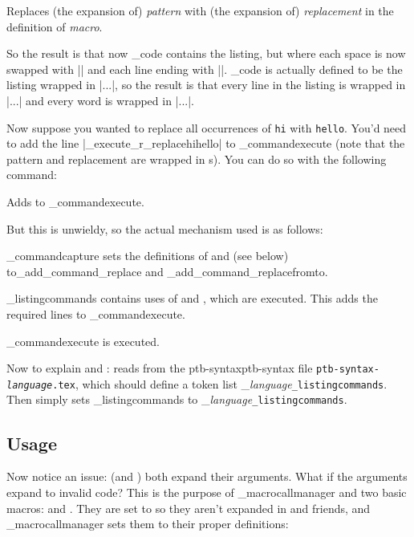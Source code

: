 Replaces (the expansion of) {\it pattern} with (the expansion of) {\it replacement} in the definition of {\it macro}.
\emacroexp

So the result is that now \macro\_code{} contains the listing, but where each space is now swapped with \inlinecode|\w \w| and each line ending with \inlinecode|\w\n\n\w|.
\macro\_code{} is actually defined to be the listing wrapped in \inlinecode|\n\w...\w\n|, so the result is that every line in the listing is wrapped in \inlinecode|\n...\n| and every word is wrapped in \inlinecode|\w...\w|.

Now suppose you wanted to replace all occurrences of {\tt hi} with {\tt hello}.
You'd need to add the line \inlinecode|\_execute{\_r_replace{\w hi\w}{\w hello\w}}| to \macro\_commandexecute{} (note that the pattern and replacement are wrapped in \macro\w s).
You can do so with the following command:

Adds  to \macro\_commandexecute.
\emacroexp

But this is unwieldy, so the actual mechanism used is as follows:
\benum
    \item \macro\_commandcapture{} sets the definitions of \macro\replace{} and \gotomacro\replacefromto{} (see below) to\hfill\break\macro\_add_command_replace{} and \macro\_add_command_replacefromto{}.
    \item \macro\_listingcommands{} contains uses of \macro\replace{} and \macro\replacefromto{}, which are executed.
        This adds the required lines to \macro\_commandexecute.
    \item \macro\_commandexecute{} is executed.
\eenum

Now to explain \gotomacro\loadsyntax{} and \gotomacro\setsyntax:  reads from the ptb-syntaxptb-syntax  file {\tt ptb-syntax-{\it language}.tex}, which should define a token list
\macro\_{\it language}{\tt _listingcommands}.
Then \macro\setsyntax{} simply sets \macro\_listingcommands{} to \macro\_{\it language}{\tt _listingcommands}.

\subsection{Usage}

Now notice an issue: \macro\replace{} (and \macro\replacefromto) both expand their arguments.
What if the arguments expand to invalid code?
This is the purpose of \macro\_macrocallmanager{} and two basic macros: \macro\call{} and \macro\mlcall.
They are set to \macro\relax{} so they aren't expanded in \macro\replace{} and friends, and \macro\_macrocallmanager{} sets them to their proper definitions:

